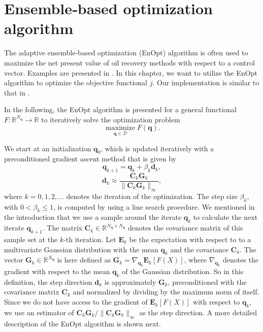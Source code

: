 \chapter{\label{ChapterEnsembleBasedOptimizationAlgorithm}Ensemble‑based optimization algorithm}

The adaptive ensemble-based optimization (EnOpt) algorithm is often used to maximize the net present value of oil recovery methods with respect to a control vector. Examples are presented in \cite{Keil2022-dj, OGUNTOLA2021109165, Zhang2023-sg}. In this chapter, we want to utilize the EnOpt algorithm to optimize the objective functional $j$. Our implementation is similar to that in \cite{Keil2022-dj}.

In the following, the EnOpt algorithm is presented for a general functional $F:\mathbb{R}^{N_\mathbf{q}}\to \mathbb{R}$ to iteratively solve the optimization problem
\begin{displaymath}
\operatorname*{maximize}_{\mathbf{q}\in\mathcal{D}}F(\mathbf{q}).
\end{displaymath}

We start at an initialization $\mathbf{q}_0$,  which is updated iteratively with a preconditioned gradient ascent method that is given by
\begin{displaymath}
\mathbf{q}_{k+1} = \mathbf{q}_k+\beta_k\mathbf{d}_k,
\end{displaymath}
\begin{displaymath}
\mathbf{d}_k\approx\frac{\mathbf{C}_k\mathbf{G}_k}{\|\mathbf{C}_k\mathbf{G}_k\|_\infty},
\end{displaymath}
where $k=0,1,2,\dotsc$ denotes the iteration of the optimization. The step size $\beta_k$, with $0<\beta_k\leq1$, is computed by using a line search procedure. We mentioned in the introduction that we use a sample around the iterate $\mathbf{q}_k$ to calculate the next iterate $\mathbf{q}_{k+1}$. The matrix $\mathbf{C}_k\in\mathbb{R}^{N_\mathbf{q}\times N_\mathbf{q}}$ denotes the covariance matrix of this sample set at the $k$-th iteration. Let $\mathbf{E}_k$ be the expectation with respect to to a multivariate Gaussian distribution with the mean $\mathbf{q}_k$ and the covariance $\mathbf{C}_k$. The vector $\mathbf{G}_k\in\mathbb{R}^{N_\mathbf{q}}$ is here defined as $\mathbf{G}_k=\nabla_{\mathbf{q}_k}\mathbf{E}_k[F(X)]$, where $\nabla_{\mathbf{q}_k}$ denotes the gradient with respect to the mean $\mathbf{q}_k$ of the Gaussian distribution. So in this definition, the step direction $\mathbf{d}_k$ is approximately $\mathbf{G}_k$, preconditioned with the covariance matrix $\mathbf{C}_k$ and normalized by dividing by the maximum norm of itself. Since we do not have access to the gradient of $\mathbf{E}_k[F(X)]$ with respect to $\mathbf{q}_k$, we use an estimator of $\mathbf{C}_k\mathbf{G}_k/\|\mathbf{C}_k\mathbf{G}_k\|_\infty$ as the step direction. A more detailed description of the EnOpt algorithm is shown next.\\

